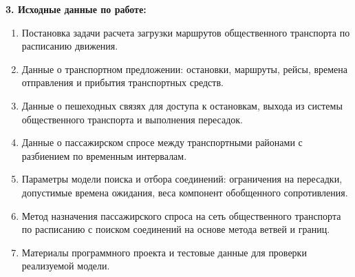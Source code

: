 \documentclass[14pt,a4paper]{extarticle}
\begin{document}
\textbf{3. Исходные данные по работе:}
\begin{enumerate}
  \item Постановка задачи расчета загрузки маршрутов общественного транспорта по расписанию движения.
  \item Данные о транспортном предложении: остановки, маршруты, рейсы, времена отправления и прибытия транспортных средств.
  \item Данные о пешеходных связях для доступа к остановкам, выхода из системы общественного транспорта и выполнения пересадок.
  \item Данные о пассажирском спросе между транспортными районами с разбиением по временным интервалам.
  \item Параметры модели поиска и отбора соединений: ограничения на пересадки, допустимые времена ожидания, веса компонент обобщенного сопротивления.
  \item Метод назначения пассажирского спроса на сеть общественного транспорта по расписанию с поиском соединений на основе метода ветвей и границ.
  \item Материалы программного проекта и тестовые данные для проверки реализуемой модели.
\end{enumerate}

\vspace{0.7em}
\end{document}
